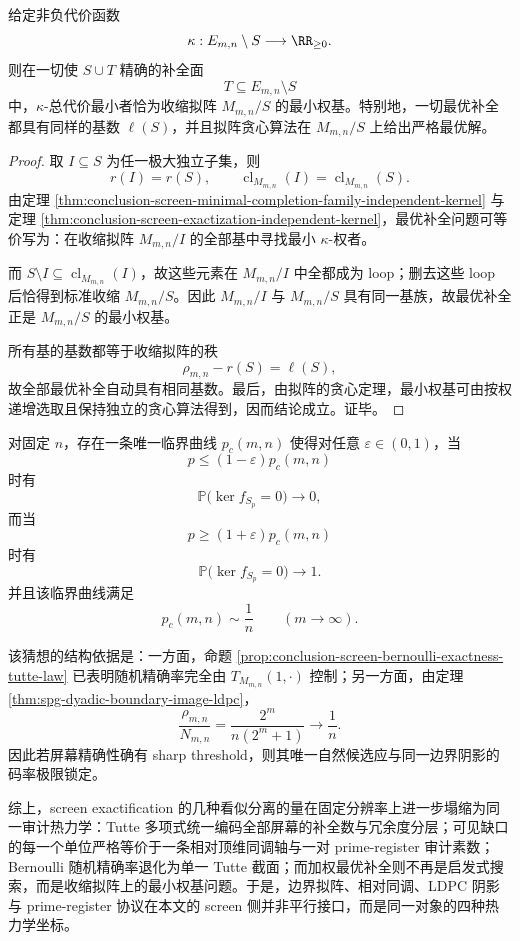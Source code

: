 \begin{proposition}[加权最优补全等价于收缩拟阵上的最小权基]\label{prop:conclusion-screen-weighted-completion-contraction-minbasis}
给定非负代价函数
\[
\kappa:E_{m,n}\setminus S\longrightarrow \RR_{\ge 0}.
\]
则在一切使 \(S\cup T\) 精确的补全面
\[
T\subseteq E_{m,n}\setminus S
\]
中，\(\kappa\)-总代价最小者恰为收缩拟阵 \(M_{m,n}/S\) 的最小权基。特别地，一切最优补全都具有同样的基数 \(\ell(S)\)，并且拟阵贪心算法在 \(M_{m,n}/S\) 上给出严格最优解。
\end{proposition}
\begin{proof}
取 \(I\subseteq S\) 为任一极大独立子集，则
\[
r(I)=r(S),
\qquad
\operatorname{cl}_{M_{m,n}}(I)=\operatorname{cl}_{M_{m,n}}(S).
\]
由定理 \ref{thm:conclusion-screen-minimal-completion-family-independent-kernel} 与定理 \ref{thm:conclusion-screen-exactization-independent-kernel}，最优补全问题可等价写为：在收缩拟阵 \(M_{m,n}/I\) 的全部基中寻找最小 \(\kappa\)-权者。

而 \(S\setminus I\subseteq \operatorname{cl}_{M_{m,n}}(I)\)，故这些元素在 \(M_{m,n}/I\) 中全都成为 loop；删去这些 loop 后恰得到标准收缩 \(M_{m,n}/S\)。因此 \(M_{m,n}/I\) 与 \(M_{m,n}/S\) 具有同一基族，故最优补全正是 \(M_{m,n}/S\) 的最小权基。

所有基的基数都等于收缩拟阵的秩
\[
\rho_{m,n}-r(S)=\ell(S),
\]
故全部最优补全自动具有相同基数。最后，由拟阵的贪心定理，最小权基可由按权递增选取且保持独立的贪心算法得到，因而结论成立。证毕。
\end{proof}

\begin{conjecture}[精确屏幕阈值的码率锁定]\label{conj:conclusion-screen-exact-threshold-code-rate-locking}
对固定 \(n\)，存在一条唯一临界曲线 \(p_c(m,n)\) 使得对任意 \(\varepsilon\in(0,1)\)，当
\[
p\le (1-\varepsilon)p_c(m,n)
\]
时有
\[
\mathbb P\bigl(\ker f_{S_p}=0\bigr)\longrightarrow 0,
\]
而当
\[
p\ge (1+\varepsilon)p_c(m,n)
\]
时有
\[
\mathbb P\bigl(\ker f_{S_p}=0\bigr)\longrightarrow 1.
\]
并且该临界曲线满足
\[
p_c(m,n)\sim \frac1n
\qquad(m\to\infty).
\]
\end{conjecture}

该猜想的结构依据是：一方面，命题 \ref{prop:conclusion-screen-bernoulli-exactness-tutte-law} 已表明随机精确率完全由 \(T_{M_{m,n}}(1,\cdot)\) 控制；另一方面，由定理 \ref{thm:spg-dyadic-boundary-image-ldpc}，
\[
\frac{\rho_{m,n}}{N_{m,n}}
=
\frac{2^m}{n(2^m+1)}
\longrightarrow
\frac1n.
\]
因此若屏幕精确性确有 sharp threshold，则其唯一自然候选应与同一边界阴影的码率极限锁定。

综上，screen exactification 的几种看似分离的量在固定分辨率上进一步塌缩为同一审计热力学：Tutte 多项式统一编码全部屏幕的补全数与冗余度分层；可见缺口的每一个单位严格等价于一条相对顶维同调轴与一对 prime-register 审计素数；Bernoulli 随机精确率退化为单一 Tutte 截面；而加权最优补全则不再是启发式搜索，而是收缩拟阵上的最小权基问题。于是，边界拟阵、相对同调、LDPC 阴影与 prime-register 协议在本文的 screen 侧并非平行接口，而是同一对象的四种热力学坐标。
